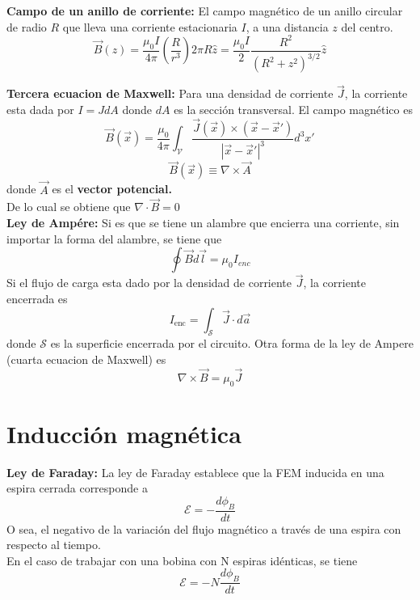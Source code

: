 \documentclass[a4paper, 10pt]{article}
\begin{document}
\begin{multicols*}{2}
	\textbf{Campo de un anillo de corriente:} El campo magnético de un anillo circular de radio $R$ que lleva una corriente estacionaria $I$, a una distancia $z$ del centro.
	$$\vec{B}(z) = \frac{\mu_0 I}{4 \pi} \left( \frac{R}{r^3} \right) 2 \pi R \hat{z} = \frac{\mu_0 I}{2} \frac{R^2}{(R^2 + z^2)^{3/2}}\hat{z}$$
	    
	\textbf{Tercera ecuacion de Maxwell:} Para una densidad de corriente $\vec{J}$, la corriente esta dada por $I=JdA$ donde $dA$ es la sección transversal. El campo magnético es
	$$\vec{B}(\vec{x})=\frac{\mu_0}{4 \pi }\int_{\mathcal{V}}\frac{\vec{J}(\vec{x})\times(\vec{x}-\vec{x}')}{|\vec{x}-\vec{x}'|^3}d^3x'$$
	$$\vec{B}(\vec{x})\equiv \nabla \times \vec{A}$$
	donde $\vec{A}$ es el \textbf{vector potencial.}\\
	De lo cual se obtiene que $\nabla \cdot \vec{B}=0$\\
	    
	\textbf{Ley de Ampére:} Si es que se tiene un alambre que encierra una corriente, sin importar la forma del alambre, se tiene que
	$$\oint \vec{B} d\vec{l} = \mu_0 I_{enc}$$
	Si el flujo de carga esta dado por la densidad de corriente $\vec{J}$, la corriente encerrada es
	$$I_{\text{enc}}=\int_{\mathcal{S}} \vec{J}\cdot d\vec{a}$$
	donde $\mathcal{S}$ es la superficie encerrada por el circuito. Otra forma de la ley de Ampere (cuarta ecuacion de Maxwell) es
	$$\nabla \times \vec{B}=\mu_0\vec{J}$$

	\section{Inducción magnética}
	\textbf{Ley de Faraday:}
	La ley de Faraday establece que la FEM inducida en una espira cerrada corresponde a
	$$\mathcal{E} = -\frac{d \phi_{B}}{dt}$$
	O sea, el negativo de la variación del flujo magnético a través de una espira con respecto al tiempo.\\
	En el caso de trabajar con una bobina con N espiras idénticas, se tiene
	$$\mathcal{E} = -N \frac{d \phi_{B}}{dt}$$
\end{multicols*}

\newpage
\end{document}
